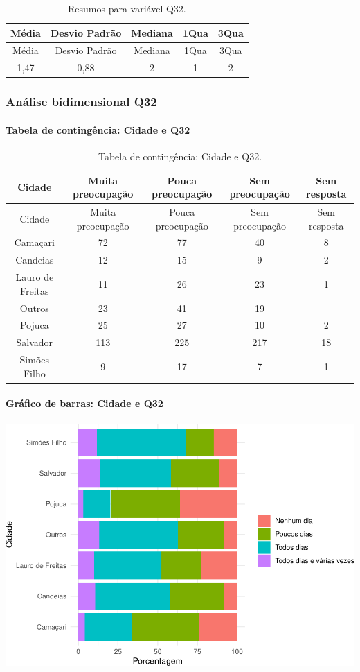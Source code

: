\documentclass[]{article}
\let\oldparagraph\paragraph
\renewcommand{\paragraph}[1]{\oldparagraph{#1}\mbox{}}
\begin{document}
\begin{longtable}[]{@{}ccccc@{}}
\caption{\label{tab:unnamed-chunk-1074}Resumos para variável Q32.}\tabularnewline
\toprule
Média & Desvio Padrão & Mediana & 1Qua & 3Qua\tabularnewline
\midrule
\endfirsthead
\toprule
Média & Desvio Padrão & Mediana & 1Qua & 3Qua\tabularnewline
\midrule
\endhead
1,47 & 0,88 & 2 & 1 & 2\tabularnewline
\bottomrule
\end{longtable}

\cleardoublepage

\hypertarget{anuxe1lise-bidimensional-q32}{%
\subsubsection{Análise bidimensional Q32}\label{anuxe1lise-bidimensional-q32}}

\hypertarget{tabela-de-continguxeancia-cidade-e-q32}{%
\paragraph{Tabela de contingência: Cidade e Q32}\label{tabela-de-continguxeancia-cidade-e-q32}}

\begin{longtable}[]{@{}ccccc@{}}
\caption{\label{tab:unnamed-chunk-1075}Tabela de contingência: Cidade e Q32.}\tabularnewline
\toprule
Cidade & Muita preocupação & Pouca preocupação & Sem preocupação & Sem resposta\tabularnewline
\midrule
\endfirsthead
\toprule
Cidade & Muita preocupação & Pouca preocupação & Sem preocupação & Sem resposta\tabularnewline
\midrule
\endhead
Camaçari & 72 & 77 & 40 & 8\tabularnewline
Candeias & 12 & 15 & 9 & 2\tabularnewline
Lauro de Freitas & 11 & 26 & 23 & 1\tabularnewline
Outros & 23 & 41 & 19 &\tabularnewline
Pojuca & 25 & 27 & 10 & 2\tabularnewline
Salvador & 113 & 225 & 217 & 18\tabularnewline
Simões Filho & 9 & 17 & 7 & 1\tabularnewline
\bottomrule
\end{longtable}

\hypertarget{gruxe1fico-de-barras-cidade-e-q32}{%
\paragraph{Gráfico de barras: Cidade e Q32}\label{gruxe1fico-de-barras-cidade-e-q32}}

\begin{center}\includegraphics[width=0.75\linewidth]{relatorio_covid19_files/figure-latex/unnamed-chunk-1076-1} \end{center}
\end{document}
